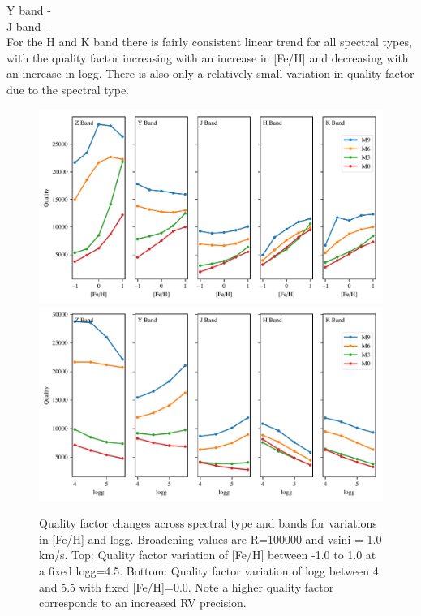 Y band -\\

J band - \\

For the H and K band there is fairly consistent linear trend for all spectral types, with the quality factor increasing with an increase in [Fe/H] and decreasing with an increase in logg. There is also only a relatively small variation in quality factor due to the spectral type.



\begin{figure}
\includegraphics[width=0.99\linewidth]{figures/information-content/metalicity_effect.pdf}\\
\includegraphics[width=0.99\linewidth]{figures/information-content/logg_effect.pdf}
\caption{Quality factor changes across spectral type and bands for variations in [Fe/H] and logg. Broadening values are R=100000 and vsini = 1.0 km/s. Top: Quality factor variation of [Fe/H] between -1.0 to 1.0 at a fixed logg=4.5. Bottom: Quality factor variation of logg between 4 and 5.5 with fixed [Fe/H]=0.0. Note a higher quality factor corresponds to an increased RV precision.}
\label{fig:deviations}
\end{figure}

